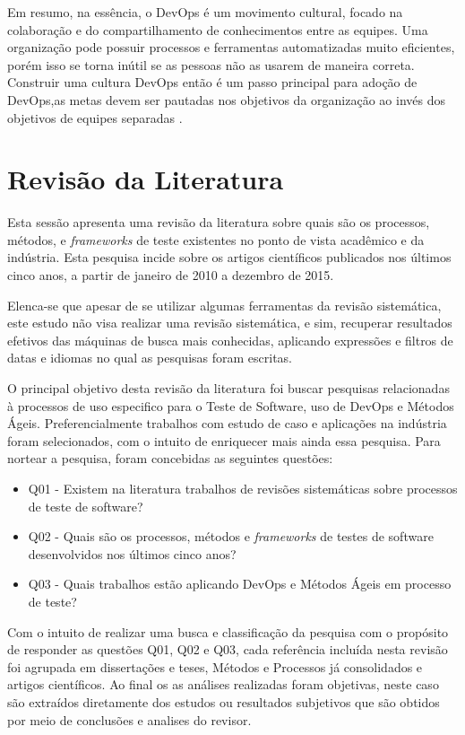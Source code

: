 Em resumo, na essência, o DevOps é um movimento cultural, focado na colaboração e do compartilhamento de conhecimentos entre as equipes. Uma organização pode possuir processos e ferramentas automatizadas muito eficientes, porém isso se torna inútil se as pessoas não as usarem de maneira correta. Construir uma cultura DevOps então é um passo principal para adoção de DevOps,as metas devem ser pautadas nos objetivos da organização ao invés dos objetivos de equipes separadas \cite{BRAGA2015}.

\section{Revisão da Literatura}
\label{sec:revisao}

Esta sessão apresenta uma revisão da literatura sobre quais são os processos, métodos, e \textit{frameworks} de teste existentes no ponto de vista acadêmico e da indústria. Esta pesquisa incide sobre os artigos científicos publicados nos últimos cinco anos, a partir de janeiro de 2010 a dezembro de 2015.

Elenca-se que apesar de se utilizar algumas ferramentas da revisão sistemática, este estudo não visa realizar uma revisão sistemática, e sim, recuperar resultados efetivos das máquinas de busca mais conhecidas, aplicando expressões e filtros de datas e idiomas no qual as pesquisas foram escritas. 

O principal objetivo desta revisão da literatura foi buscar pesquisas relacionadas à processos de uso especifico para o Teste de Software, uso de DevOps e Métodos Ágeis. Preferencialmente trabalhos com estudo de caso e aplicações na indústria foram selecionados, com o intuito de enriquecer mais ainda essa pesquisa. Para nortear a pesquisa, foram concebidas as seguintes questões:

\begin{itemize}
\item Q01 - Existem na literatura trabalhos de revisões sistemáticas sobre processos de teste de software?   
\item Q02 - Quais são os processos, métodos e \textit{frameworks} de testes de software desenvolvidos nos últimos cinco anos?
\item Q03 - Quais trabalhos estão aplicando DevOps e Métodos Ágeis em processo de teste?
\end{itemize}

Com o intuito de realizar uma busca e classificação da pesquisa com o propósito de responder as questões Q01, Q02 e Q03, cada referência incluída nesta revisão foi agrupada em dissertações e teses, Métodos e Processos já consolidados e artigos científicos. Ao final os as análises realizadas foram objetivas, neste caso são extraídos diretamente dos estudos ou resultados subjetivos que são obtidos por meio de conclusões e analises do revisor.


